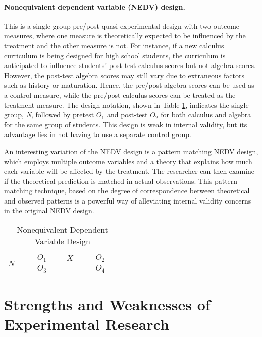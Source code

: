 \paragraph{Nonequivalent dependent variable (NEDV) design.} This is a single-group pre/post quasi-experimental design with two outcome measures, where one measure is theoretically expected to be influenced by the treatment and the other measure is not. For instance, if a new calculus curriculum is being designed for high school students, the curriculum is anticipated to influence students' post-test calculus scores but not algebra scores. However, the post-test algebra scores may still vary due to extraneous factors such as history or maturation. Hence, the pre/post algebra scores can be used as a control measure, while the pre/post calculus scores can be treated as the treatment measure. The design notation, shown in Table \ref{09:tab13}, indicates the single group, \textit{N}, followed by pretest $ O_1 $ and post-test $ O_2 $ for both calculus and algebra for the same group of students. This design is weak in internal validity, but its advantage lies in not having to use a separate control group.

An interesting variation of the NEDV design is a pattern matching NEDV design, which employs multiple outcome variables and a theory that explains how much each variable will be affected by the treatment. The researcher can then examine if the theoretical prediction is matched in actual observations. This pattern-matching technique, based on the degree of correspondence between theoretical and observed patterns is a powerful way of alleviating internal validity concerns in the original NEDV design.

\begin{table}[H]
	\centering
	\begin{tabularx}{0.65\linewidth}{p{0.15\linewidth}p{0.15\linewidth}p{0.15\linewidth}p{0.15\linewidth}}
		\toprule
		\multirow{2}{*}{$ N $} & $ O_1 $ & $ X $ & $ O_2 $ \\
		                       & $ O_3 $ &       & $ O_4 $ \\
		\bottomrule
	\end{tabularx}
	\caption{Nonequivalent Dependent Variable Design}
	\label{09:tab13}
\end{table}

\section{Strengths and Weaknesses of Experimental Research}

